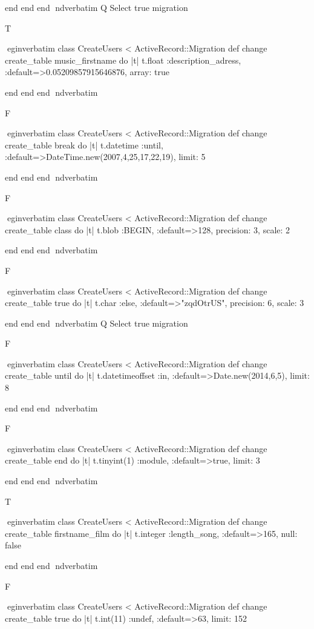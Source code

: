    end 
  end 
end
nd{verbatim}
Q
 Select true migration

T

egin{verbatim}
 class CreateUsers < ActiveRecord::Migration 
  def change 
    create_table music_firstname do |t| 
      t.float :description_adress, :default=>0.05209857915646876, array: true
    
    end 
  end 
end
nd{verbatim}

F

egin{verbatim}
 class CreateUsers < ActiveRecord::Migration 
  def change 
    create_table break do |t| 
      t.datetime :until, :default=>DateTime.new(2007,4,25,17,22,19), limit: 5
    
    end 
  end 
end
nd{verbatim}

F

egin{verbatim}
 class CreateUsers < ActiveRecord::Migration 
  def change 
    create_table class do |t| 
      t.blob :BEGIN, :default=>128, precision: 3, scale: 2
    
    end 
  end 
end
nd{verbatim}

F

egin{verbatim}
 class CreateUsers < ActiveRecord::Migration 
  def change 
    create_table true do |t| 
      t.char :else, :default=>"zqdOtrUS", precision: 6, scale: 3
    
    end 
  end 
end
nd{verbatim}
Q
 Select true migration

F

egin{verbatim}
 class CreateUsers < ActiveRecord::Migration 
  def change 
    create_table until do |t| 
      t.datetimeoffset :in, :default=>Date.new(2014,6,5), limit: 8
    
    end 
  end 
end
nd{verbatim}

F

egin{verbatim}
 class CreateUsers < ActiveRecord::Migration 
  def change 
    create_table end do |t| 
      t.tinyint(1) :module, :default=>true, limit: 3
    
    end 
  end 
end
nd{verbatim}

T

egin{verbatim}
 class CreateUsers < ActiveRecord::Migration 
  def change 
    create_table firstname_film do |t| 
      t.integer :length_song, :default=>165, null: false
    
    end 
  end 
end
nd{verbatim}

F

egin{verbatim}
 class CreateUsers < ActiveRecord::Migration 
  def change 
    create_table true do |t| 
      t.int(11) :undef, :default=>63, limit: 152
    
